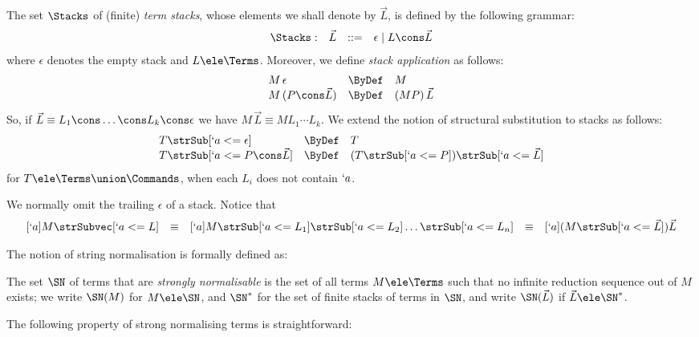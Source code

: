 \documentclass{CSML}
\newcommand{\vect}[1]{\vec{#1}}
\begin{document}
 \begin{defi}
The set $\Stacks$ of (finite) \emph{term stacks}, whose elements we shall denote by $ \vect{L}$, is defined by
the following grammar:
%
 \[ \begin{array}{l@{\quad}rcl}
\Stacks : & \vect{L} & :: =& \epsilon \mid L \cons \vect{L} 
 \end{array} \]
where $\epsilon$ denotes the empty stack and $L \ele\Terms$.
Moreover, we define \emph{stack application} as follows:
%
 \[ \begin{array}{l@{\quad}rl}
M\,\epsilon & \ByDef & M \\
M \, (P\cons \vect{L} ) & \ByDef & (MP) \, \vect{L}
 \end{array} \]
So, if $\vect{L} \equiv L_1\cons \dots \cons L_k\cons\epsilon$ we have $M \, \vect{L} \equiv M L_1 \cdots L_k$. 
We extend the notion of structural substitution to stacks as follows:
%
 \[ \begin{array}{l@{\quad}rl}
T \strSub[ `a <= \epsilon ] & \ByDef & T \\
T \strSub[ `a <= P \cons \vect{L} ] & \ByDef & (T \strSub[ `a <= P ] ) \strSub[ `a <=\vect{L} ] 
 \end{array} \]
for $T \ele \Terms \union \Commands$, when each $L_i$ does not contain $`a$.
 \end{defi}
We normally omit the trailing $\epsilon$ of a stack. 
Notice that
%
 \[ \begin{array}{lclclcl}
[`a]M \strSubvec[ `a <= L ] 
 & \equiv &
[`a]M \strSub[ `a <= L_1 ] \strSub[ `a <= L_2 ] \dots \strSub[ `a <= L_n ] 
 & \equiv &
[`a](M\strSub[ `a <= {\vect{L}} ]) \vect{L} 
 \end{array} \]

The notion of string normalisation is formally defined as:

 \begin{defi} 
The set $\SN$ of terms that are \emph{strongly normalisable} is the set of all terms $M \ele \Terms$ such that no infinite reduction sequence out of $M$ exists; we write $\SN(M)$ for $M \ele \SN$, and $ \SN^*$ for the set of finite stacks of terms in $ \SN$, and write $\SN(\vect{L})$ if $\vect{L} \ele \SN^*$.
 \end{defi}

The following property of strong normalising terms is straightforward:
\end{document}

